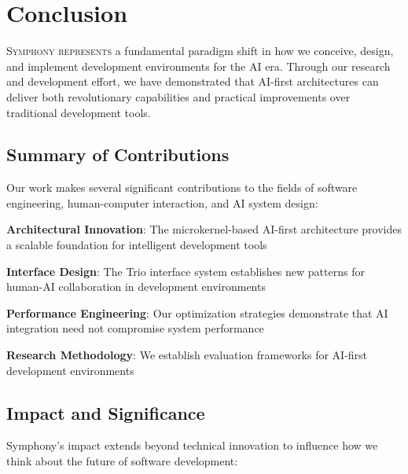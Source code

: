 
\section*{Conclusion}

\lettrine{S}{ymphony represents} a fundamental paradigm shift in how we conceive, design, and implement development environments for the AI era. Through our research and development effort, we have demonstrated that AI-first architectures can deliver both revolutionary capabilities and practical improvements over traditional development tools.

\subsection*{Summary of Contributions}

Our work makes several significant contributions to the fields of software engineering, human-computer interaction, and AI system design:

\begin{expandedlist}
    \item \textbf{Architectural Innovation}: The microkernel-based AI-first architecture provides a scalable foundation for intelligent development tools
    \item \textbf{Interface Design}: The Trio interface system establishes new patterns for human-AI collaboration in development environments
    \item \textbf{Performance Engineering}: Our optimization strategies demonstrate that AI integration need not compromise system performance
    \item \textbf{Research Methodology}: We establish evaluation frameworks for AI-first development environments
\end{expandedlist}

\subsection*{Impact and Significance}

Symphony's impact extends beyond technical innovation to influence how we think about the future of software development:

